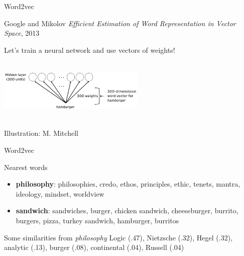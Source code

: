 \documentclass[
  10pt,
  ignorenonframetext,
  x11names, dvipsnames, bibspacing, natbib, table]{beamer}
\begin{document}
\begin{frame}{Word2vec}
\protect\hypertarget{word2vec-6}{}
\begin{block}{Google and Mikolov}
\protect\hypertarget{google-and-mikolov-1}{}
\emph{Efficient Estimation of Word Representation in Vector Space}, 2013

Let's train a neural network and use vectors of weights!

\begin{center}
 \includegraphics[height = 3cm, width = 7cm]{images/word2vec2.png}
\end{center}

\vspace{-3mm}

\tiny \hfill \color{gray}Illustration: M. Mitchell \color{black}
\end{block}
\end{frame}

\begin{frame}{Word2vec}
\protect\hypertarget{word2vec-7}{}
\begin{block}{Nearest words}
\protect\hypertarget{nearest-words}{}
\begin{itemize}
\item \textbf{philosophy}: philosophies, credo, ethos, principles, ethic, tenets, mantra, ideology, mindset, worldview

\item \textbf{sandwich}: sandwiches, burger, chicken sandwich, cheeseburger, burrito, burgers, pizza, turkey sandwich, hamburger, burritos
\end{itemize}

\pause
\end{block}

\begin{block}{Some similarities from \emph{philosophy}}
\protect\hypertarget{some-similarities-from}{}
Logic (.47), Nietzsche (.32), Hegel (.32), analytic (.13), burger (.08),
continental (.04), Russell (.04)
\end{block}
\end{frame}
\end{document}
